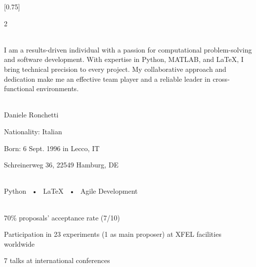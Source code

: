 \documentclass[lighthipster]{simplehipstercv}
\begin{document}
\setlength{\columnsep}{1.5cm}
[0.75]
\begin{paracol}{2}

\paracolbackgroundoptions



\footnotesize
{\setasidefontcolour
\flushright

\begin{center}
\end{center}

\\[0.5em]
{\footnotesize
I am a results-driven individual with a passion for computational problem-solving and software development. With expertise in Python, MATLAB, and \LaTeX{}, I bring technical precision to every project. My collaborative approach and dedication make me an effective team player and a reliable leader in cross-functional environments.}
\bigskip

 \\[0.5em]
Daniele Ronchetti

Nationality: Italian

Born: 6 Sept. 1996 in Lecco, IT

 Schreinerweg 36, 22549 Hamburg, DE
\bigskip

 \\
Python ~•~ \LaTeX{} ~•~ Agile Development
\bigskip

 \\[0.5em]
 70\% proposals' acceptance rate (7/10)

 Participation in 23 experiments (1 as main proposer) at XFEL facilities worldwide

 7 talks at international conferences

\bigskip


}
\end{paracol}
\end{document}
